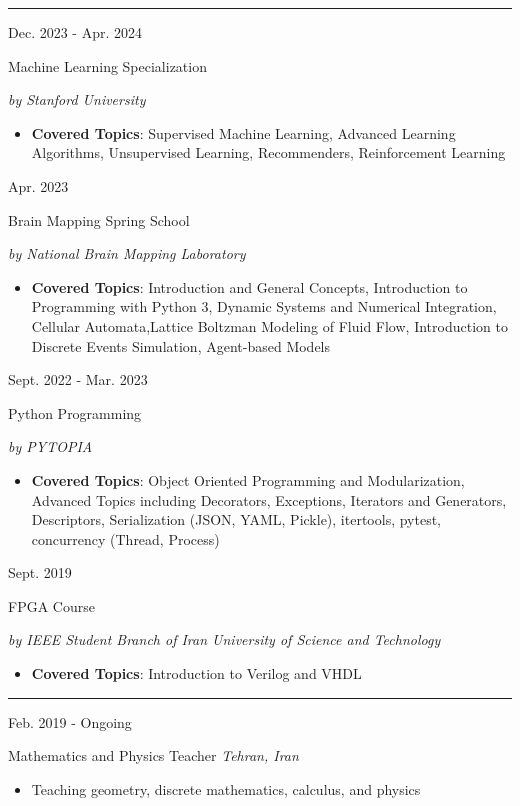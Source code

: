 \documentclass[a4paper,10pt]{article}
\newlength{\cvcolumngapwidth}
\newlength{\cvleftcolumnwidth}
\newlength{\cvrightcolumnwidth}
\newcommand{\cvsectionstyle}[1]{{\normalsize\cvsectionfont\textcolor{cvsectioncolor}{#1}}}
\newcommand{\cvtitlestyle}[1]{{\large\cvtitlefont\textcolor{cvtitlecolor}{#1}}}
\newcommand{\cvdurationstyle}[1]{{\small\cvdurationfont\textcolor{cvdurationcolor}{#1}}}
\newlength{\cvafteritemskipamount}
\newlength{\cvaftersectionskipamount}
\newlength{\cvaftertitleskipamount}
\newlength{\cvparskip}
\newcommand{\cvsection}[1]{
    \begin{minipage}[t]{\cvleftcolumnwidth}
        \raggedleft\cvsectionstyle{#1}
    \end{minipage}%
    \hspace{\cvcolumngapwidth}%
    \begin{minipage}[t]{\cvrightcolumnwidth}
        \textcolor{cvrulecolor}{\rule{\cvrightcolumnwidth}{0.3mm}}
    \end{minipage}

    \vspace{\cvaftersectionskipamount}
}
\newcommand{\cvitem}[2]{
    \begin{minipage}[t]{\cvleftcolumnwidth}
        \raggedleft #1
    \end{minipage}%
    \hspace{\cvcolumngapwidth}%
    \begin{minipage}[t]{\cvrightcolumnwidth}
        \setlength{\parskip}{\cvparskip} #2
    \end{minipage}

    \vspace{\cvafteritemskipamount}
}
\newcommand{\cvtitle}[1]{
    \cvtitlestyle{#1}

    \vspace{\cvaftertitleskipamount}
    \vspace{-\cvparskip}
}
\begin{document}
\cvsection{Online Course}
\cvitem{
    \cvdurationstyle{Dec. 2023 - Apr. 2024}
}{
    \cvtitle{{Machine Learning Specialization}}
    \textit{by Stanford University}
    \begin{itemize}[leftmargin=*]
        \item {\textbf{Covered Topics}: Supervised Machine Learning, Advanced Learning Algorithms, Unsupervised Learning, Recommenders, Reinforcement Learning}
    \end{itemize}
}

\cvitem{
    \cvdurationstyle{Apr. 2023}
}{
    \cvtitle{{Brain Mapping Spring School}}
    \textit{by National Brain Mapping Laboratory}
    \begin{itemize}[leftmargin=*]
        \item {\textbf{Covered Topics}: Introduction and General Concepts, Introduction to Programming with Python 3, Dynamic Systems and Numerical Integration, Cellular Automata,Lattice Boltzman Modeling of Fluid Flow, Introduction to Discrete Events Simulation, Agent-based Models}
    \end{itemize}
}


\cvitem{
    \cvdurationstyle{Sept. 2022 - Mar. 2023}
}{
    \cvtitle{{Python Programming}}
    \textit{by PYTOPIA}
    \begin{itemize}[leftmargin=*]
        \item {\textbf{Covered Topics}: Object Oriented Programming and Modularization, Advanced Topics including
              Decorators, Exceptions, Iterators and Generators, Descriptors, Serialization (JSON, YAML, Pickle), itertools, pytest, concurrency (Thread, Process)}
    \end{itemize}
}

\cvitem{
    \cvdurationstyle{Sept. 2019}
}{
    \cvtitle{{FPGA Course}}
    \textit{by IEEE Student Branch of Iran University of Science and Technology}
    \begin{itemize}[leftmargin=*]
        \item {\textbf{Covered Topics}:  Introduction to Verilog and VHDL}
    \end{itemize}
}

\cvsection{Volunteer Experience}
\cvitem{
    \cvdurationstyle{Feb. 2019 - Ongoing}
}{
    \cvtitle{{Mathematics and Physics Teacher} \hfill{\textnormal{\textit{Tehran, Iran}}}}
    {}
    \begin{itemize}[leftmargin=*]
        \item Teaching geometry, discrete mathematics, calculus, and physics
    \end{itemize}
}
\end{document}
